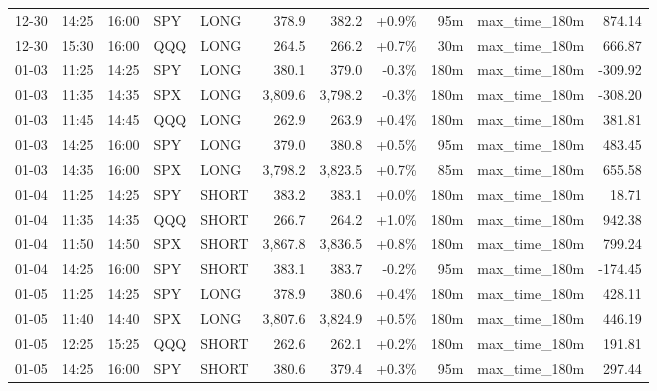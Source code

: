 \documentclass[11pt,a4paper,twoside]{article}
\begin{document}
\begin{center}
\begin{longtable}{>{\color{txtmain}}l l l l l r r r r >{\color{txtmain}}l r}
12-30 & 14:25 & 16:00 & SPY & LONG & 378.9 & 382.2 & \textcolor{wingreen}{+0.9\%} & 95m & max\_time\_180m & \textcolor{wingreen}{874.14} \\
12-30 & 15:30 & 16:00 & QQQ & LONG & 264.5 & 266.2 & \textcolor{wingreen}{+0.7\%} & 30m & max\_time\_180m & \textcolor{wingreen}{666.87} \\
01-03 & 11:25 & 14:25 & SPY & LONG & 380.1 & 379.0 & \textcolor{lossred}{-0.3\%} & 180m & max\_time\_180m & \textcolor{lossred}{-309.92} \\
01-03 & 11:35 & 14:35 & SPX & LONG & 3,809.6 & 3,798.2 & \textcolor{lossred}{-0.3\%} & 180m & max\_time\_180m & \textcolor{lossred}{-308.20} \\
01-03 & 11:45 & 14:45 & QQQ & LONG & 262.9 & 263.9 & \textcolor{wingreen}{+0.4\%} & 180m & max\_time\_180m & \textcolor{wingreen}{381.81} \\
01-03 & 14:25 & 16:00 & SPY & LONG & 379.0 & 380.8 & \textcolor{wingreen}{+0.5\%} & 95m & max\_time\_180m & \textcolor{wingreen}{483.45} \\
01-03 & 14:35 & 16:00 & SPX & LONG & 3,798.2 & 3,823.5 & \textcolor{wingreen}{+0.7\%} & 85m & max\_time\_180m & \textcolor{wingreen}{655.58} \\
01-04 & 11:25 & 14:25 & SPY & SHORT & 383.2 & 383.1 & \textcolor{wingreen}{+0.0\%} & 180m & max\_time\_180m & \textcolor{wingreen}{18.71} \\
01-04 & 11:35 & 14:35 & QQQ & SHORT & 266.7 & 264.2 & \textcolor{wingreen}{+1.0\%} & 180m & max\_time\_180m & \textcolor{wingreen}{942.38} \\
01-04 & 11:50 & 14:50 & SPX & SHORT & 3,867.8 & 3,836.5 & \textcolor{wingreen}{+0.8\%} & 180m & max\_time\_180m & \textcolor{wingreen}{799.24} \\
01-04 & 14:25 & 16:00 & SPY & SHORT & 383.1 & 383.7 & \textcolor{lossred}{-0.2\%} & 95m & max\_time\_180m & \textcolor{lossred}{-174.45} \\
01-05 & 11:25 & 14:25 & SPY & LONG & 378.9 & 380.6 & \textcolor{wingreen}{+0.4\%} & 180m & max\_time\_180m & \textcolor{wingreen}{428.11} \\
01-05 & 11:40 & 14:40 & SPX & LONG & 3,807.6 & 3,824.9 & \textcolor{wingreen}{+0.5\%} & 180m & max\_time\_180m & \textcolor{wingreen}{446.19} \\
01-05 & 12:25 & 15:25 & QQQ & SHORT & 262.6 & 262.1 & \textcolor{wingreen}{+0.2\%} & 180m & max\_time\_180m & \textcolor{wingreen}{191.81} \\
01-05 & 14:25 & 16:00 & SPY & SHORT & 380.6 & 379.4 & \textcolor{wingreen}{+0.3\%} & 95m & max\_time\_180m & \textcolor{wingreen}{297.44} \\

\end{longtable}
\end{center}
\end{document}
